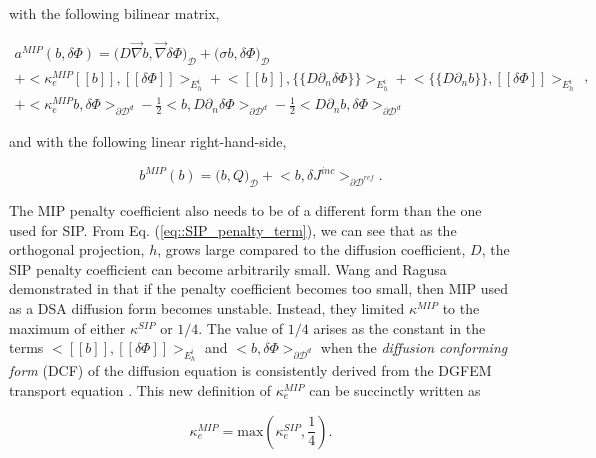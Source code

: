 \noindent with the following bilinear matrix,

\begin{equation}
\label{eq::MIP_bilinear_form}
\begin{aligned}
a^{MIP}(b, \delta \Phi)  = \Big(  D \vec{\nabla} b , \vec{\nabla} \delta \Phi  \Big)_{\mathcal{D}} + \Big(  \sigma b , \delta \Phi  \Big)_{\mathcal{D}}    \\
+  \Big< \kappa_e^{MIP} [\![   b ]\!] , [\![  \delta \Phi ]\!]\Big>_{E_h^i} + \Big<  [\![  b ]\!] , \{\!\{  D \partial_n \delta \Phi \}\!\}\Big>_{E_h^i}  + \Big< \{\!\{  D \partial_n b \}\!\} , [\![ \delta \Phi ]\!]\Big>_{E_h^i} \\
+ \Big< \kappa_e^{MIP}  b , \delta  \Phi \Big>_{\partial \mathcal{D}^d} - \frac{1}{2} \Big<  b ,  D \partial_n \delta \Phi \Big>_{\partial \mathcal{D}^d} - \frac{1}{2} \Big<   D \partial_n b , \delta \Phi \Big>_{\partial \mathcal{D}^d}  
\end{aligned} ,
\end{equation}

\noindent and with the following linear right-hand-side,

\begin{equation}
\label{eq::MIP_linear_form}
b^{MIP} (b) = \Big(  b, Q  \Big)_{\mathcal{D}}  + \Big< b, \delta  J^{inc}  \Big>_{\partial \mathcal{D}^{ref}} .
\end{equation}

\noindent The MIP penalty coefficient also needs to be of a different form than the one used for SIP. From Eq. (\ref{eq::SIP_penalty_term}), we can see that as the orthogonal projection, $h$, grows large compared to the diffusion coefficient, $D$, the SIP penalty coefficient can become arbitrarily small. Wang and Ragusa demonstrated in \cite{ragusa2010two} that if the penalty coefficient becomes too small, then MIP used as a DSA diffusion form becomes unstable. Instead, they limited $\kappa^{MIP}$ to the maximum of either $\kappa^{SIP}$ or $1/4$. The value of $1/4$ arises as the constant in the terms $\Big<  [\![   b ]\!] , [\![  \delta \Phi ]\!]\Big>_{E_h^i} $ and $\Big<  b , \delta  \Phi \Big>_{\partial \mathcal{D}^d}$ when the {\em diffusion conforming form} (DCF) of the diffusion equation is consistently derived from the DGFEM transport equation \cite{ref::DSA_wang_ragusa}. This new definition of $\kappa_e^{MIP}$ can be succinctly written as

\begin{equation}
\label{eq::MIP_penalty_term}
\kappa_e^{MIP} = \text{max} \left( \kappa_e^{SIP}, \frac{1}{4} \right).
\end{equation}

